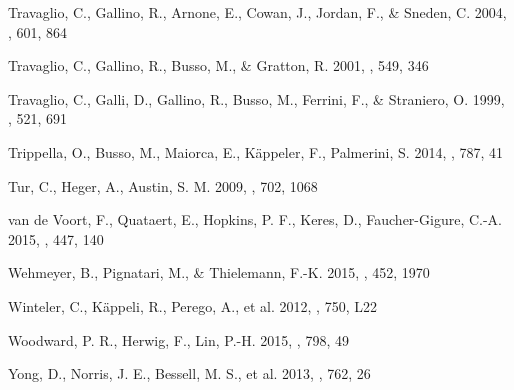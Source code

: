 \documentclass[manuscript]{aastex}
\begin{document}
\begin{thebibliography}{}
 Travaglio,
C., Gallino, R., Arnone, E., Cowan, J., Jordan, F., \& Sneden, C. 2004, \apj, 601, 864

 Travaglio,
C., Gallino, R., Busso, M., \& Gratton, R. 2001, \apj, 549, 346

 Travaglio, 
C., Galli, D., Gallino, R., Busso, M., Ferrini, F., \& Straniero, O. 1999, \apj, 521, 691

Trippella, O., Busso, M., Maiorca, E., K{\"a}ppeler, F., Palmerini, S.
2014, \apj, 787, 41

Tur, C., Heger, A., Austin, S. M. 2009, \apj, 702, 1068

van de Voort, F., Quataert, E., Hopkins, P. F., Keres, D., Faucher-Gigure, C.-A.
2015, \mnras, 447, 140

 Wehmeyer, B., Pignatari, M., \& Thielemann, F.-K. 2015, \mnras, 452, 1970

Winteler, C., K{\"a}ppeli, R., Perego, A., et al. 2012, \apjl, 750, L22

 Woodward, P. R., Herwig, F., Lin, P.-H. 2015, \apj, 798, 49

Yong, D., Norris, J. E., Bessell, M. S., et al. 2013, \apj, 762, 26


\end{thebibliography}
\end{document}
